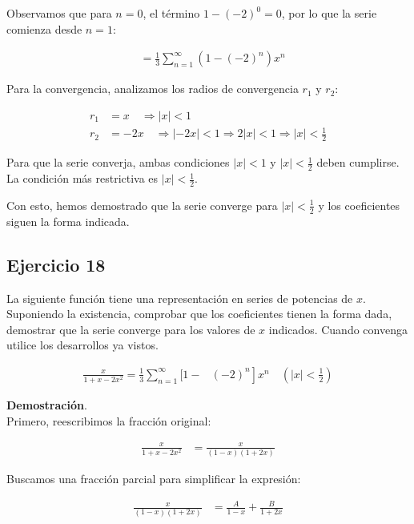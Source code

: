 \documentclass{article}
\begin{document}
    Observamos que para $n = 0$, el término $1 - (-2)^0 = 0$, por lo que la serie comienza desde $n=1$:

    \begin{align*}
    &= \frac{1}{3} \sum_{n=1}^{\infty} \left(1 - (-2)^n\right) x^n
    \end{align*}

    Para la convergencia, analizamos los radios de convergencia $r_1$ y $r_2$:

    \begin{align*}
    r_1 &= x \quad \Rightarrow |x| < 1 \\
    r_2 &= -2x \quad \Rightarrow |-2x| < 1 \Rightarrow 2|x| < 1 \Rightarrow |x| < \frac{1}{2}
    \end{align*}

    Para que la serie converja, ambas condiciones $|x| < 1$ y $|x| < \frac{1}{2}$ deben cumplirse. La condición más restrictiva es $|x| < \frac{1}{2}$.

    Con esto, hemos demostrado que la serie converge para $|x| < \frac{1}{2}$ y los coeficientes siguen la forma indicada.

    \subsection*{Ejercicio 18}

    La siguiente función tiene una representación en series de potencias de $x$. Suponiendo la existencia, comprobar que los coeficientes tienen la forma dada, demostrar que la serie converge para los valores de $x$ indicados. Cuando convenga utilice los desarrollos ya vistos.

    $$
    \begin{aligned}
    \frac{x}{1+x-2 x^{2}}=\frac{1}{3} \sum_{n=1}^{\infty}[1- & \left.(-2)^{n}\right] x^{n} \quad\left(|x|<\frac{1}{2}\right)
    \end{aligned}
    $$

    \textbf{Demostración}.\\

    Primero, reescribimos la fracción original:

    \begin{align*}
    \frac{x}{1+x-2 x^{2}}
    &= \frac{x}{(1-x)(1+2 x)}
    \end{align*}

    Buscamos una fracción parcial para simplificar la expresión:

    \begin{align*}
    \frac{x}{(1-x)(1+2 x)}
    &= \frac{A}{1-x} + \frac{B}{1+2 x}
    \end{align*}
\end{document}
